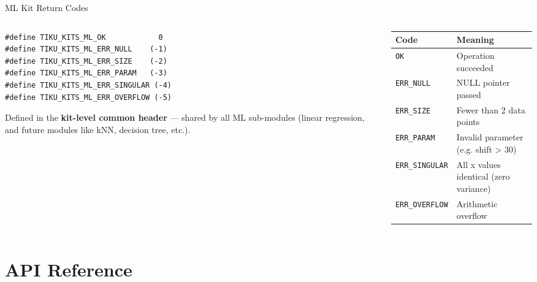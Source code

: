 \documentclass[aspectratio=169, 10pt]{beamer}
\begin{document}
\begin{frame}[fragile]{ML Kit Return Codes}
\begin{columns}[T]
\begin{column}{0.48\textwidth}
\begin{lstlisting}[style=cstyle, title={ml/tiku\_kits\_ml.h}]
#define TIKU_KITS_ML_OK            0
#define TIKU_KITS_ML_ERR_NULL    (-1)
#define TIKU_KITS_ML_ERR_SIZE    (-2)
#define TIKU_KITS_ML_ERR_PARAM   (-3)
#define TIKU_KITS_ML_ERR_SINGULAR (-4)
#define TIKU_KITS_ML_ERR_OVERFLOW (-5)
\end{lstlisting}

\vspace{0.3em}
Defined in the \textbf{kit-level common header} ---
shared by all ML sub-modules (linear regression, and
future modules like kNN, decision tree, etc.).
\end{column}

\begin{column}{0.48\textwidth}
\begin{table}
\centering
\small
\begin{tabular}{@{}lp{4.5cm}@{}}
\toprule
\textbf{Code} & \textbf{Meaning} \\
\midrule
\texttt{OK}       & Operation succeeded \\
\texttt{ERR\_NULL} & NULL pointer passed \\
\texttt{ERR\_SIZE} & Fewer than 2 data points \\
\texttt{ERR\_PARAM} & Invalid parameter (e.g. shift > 30) \\
\texttt{ERR\_SINGULAR} & All x values identical (zero variance) \\
\texttt{ERR\_OVERFLOW} & Arithmetic overflow \\
\bottomrule
\end{tabular}
\end{table}
\end{column}
\end{columns}
\end{frame}

\section{API Reference}
\end{document}
